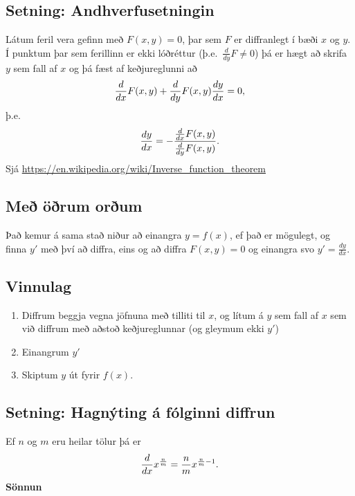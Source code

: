 \documentclass[b5paper,10pt,icelandic]{sphinxmanual}
\begin{document}
\subsection{Setning: Andhverfusetningin}
\label{kafli03:setning-andhverfusetningin}
Látum feril vera gefinn með \(F(x,y) =0\), þar sem \(F\) er
diffranlegt í bæði \(x\) og \(y\). Í punktum þar sem ferillinn
er ekki lóðréttur (þ.e. \(\frac{d}{dy}F \neq 0\)) þá er hægt að
skrifa \(y\) sem fall af \(x\) og þá fæst af keðjureglunni að
\begin{gather}
\begin{split}\frac{d}{dx} F(x,y) + \frac{d}{dy}F(x,y) \frac{dy}{dx} = 0,\end{split}\notag
\end{gather}
þ.e.
\begin{gather}
\begin{split}\frac{dy}{dx} = -\frac{\frac{d}{dx} F(x,y)}{\frac{d}{dy} F(x,y)}.\end{split}\notag
\end{gather}
Sjá \href{https://en.wikipedia.org/wiki/Inverse\_function\_theorem}{https://en.wikipedia.org/wiki/Inverse\_function\_theorem}


\subsection{Með öðrum orðum}
\label{kafli03:me-orum-orum}
Það kemur á sama stað niður að einangra \(y=f(x)\), ef það er
mögulegt, og finna \(y'\) með því að diffra, eins og að diffra
\(F(x,y)=0\) og einangra svo \(y'=\frac{dy}{dx}\).


\subsection{Vinnulag}
\label{kafli03:vinnulag}\begin{enumerate}
\item {} 
Diffrum beggja vegna jöfnuna með tilliti til \(x\), og lítum á
\(y\) sem fall af \(x\) sem við diffrum með aðstoð
keðjureglunnar (og gleymum ekki \(y'\))

\item {} 
Einangrum \(y'\)

\item {} 
Skiptum \(y\) út fyrir \(f(x)\).

\end{enumerate}


\subsection{Setning: Hagnýting á fólginni diffrun}
\label{kafli03:setning-hagnyting-a-folginni-diffrun}
Ef \(n\) og \(m\) eru heilar tölur þá er
\begin{gather}
\begin{split}\frac{d}{dx} x^{\frac nm} = \frac nm x^{\frac nm -1}.\end{split}\notag
\end{gather}
\textbf{Sönnun}
\end{document}

